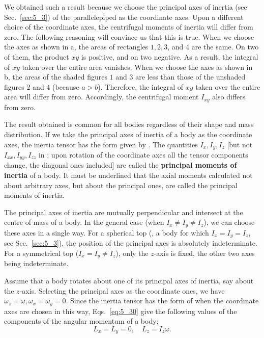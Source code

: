 We obtained such a result because we choose the principal axes of inertia (see Sec.~\ref{sec:5_3}) of the parallelepiped as the coordinate axes. Upon a different choice of the coordinate axes, the centrifugal moments of inertia will differ from zero. The following reasoning will convince us that this is true. When we choose the axes as shown in a, the areas of rectangles $1, 2, 3$, and $4$ are the same. On two of them, the product $xy$ is positive, and on two negative. As a result, the integral of $xy$ taken over the entire area vanishes. When we choose the axes as shown in b, the areas of the shaded figures $1$ and $3$ are less than those of the unshaded figures $2$ and $4$ (because $a>b$). Therefore, the integral of $xy$ taken over the entire area will differ from zero. Accordingly, the centrifugal moment $I_{xy}$ also differs from zero.

The result obtained is common for all bodies regardless of their shape and mass distribution. If we take the principal axes of inertia of a body as the coordinate axes, the inertia tensor has the form given by . The quantities $I_x, I_y, I_z$ [but not $I_{xx}, I_{yy}, I_{zz}$ in ; upon rotation of the coordinate axes all the tensor components change, the diagonal ones included] are called the \textbf{principal moments of inertia} of a body. It must be underlined that the axial moments calculated not about arbitrary axes, but about the principal ones, are called the principal moments of inertia.

The principal axes of inertia are mutually perpendicular and intersect at the centre of mass of a body. In the general case (when $I_x\neq I_y\neq I_z$), we can choose these axes in a single way. For a spherical top (\ie, a body for which $I_x=I_y=I_z$, see Sec.~\ref{sec:5_3}), the position of the principal axes is absolutely indeterminate. For a symmetrical top ($I_x=I_y\neq I_z$), only the $z$-axis is fixed, the other
two axes being indeterminate.

Assume that a body rotates about one of its principal axes of inertia, say about the $z$-axis. Selecting the principal axes as the coordinate ones, we have $\omega_z=\omega, \omega_x=\omega_y=0$. Since the inertia tensor has the form of  when the coordinate axes are chosen in this way, Eqs.~\eqref{eq:5_30} give the following values of the components of the angular momentum of a body:
\begin{equation*}
L_x = L_y = 0,\quad L_z=I_z\omega.
\end{equation*}

